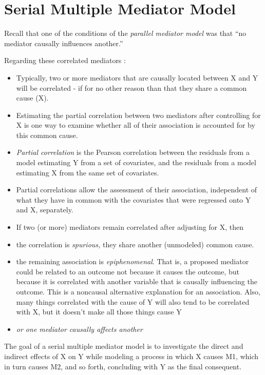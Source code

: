 \documentclass[
  11pt,
]{book}
\providecommand{\tightlist}{%
  \setlength{\itemsep}{0pt}\setlength{\parskip}{0pt}}
\begin{document}
\hypertarget{serial-multiple-mediator-model}{%
\section{Serial Multiple Mediator Model}\label{serial-multiple-mediator-model}}

Recall that one of the conditions of the \emph{parallel mediator model} was that ``no mediator causally influences another.''

Regarding these correlated mediators \citep{hayes_more_2022}:

\begin{itemize}
\tightlist
\item
  Typically, two or more mediators that are causally located between X and Y will be correlated - if for no other reason than that they share a common cause (X).
\item
  Estimating the partial correlation between two mediators after controlling for X is one way to examine whether all of their association is accounted for by this common cause.
\item
  \emph{Partial correlation} is the Pearson correlation between the residuals from a model estimating Y from a set of covariates, and the residuals from a model estimating X from the same set of covariates.
\item
  Partial correlations allow the assessment of their association, independent of what they have in common with the covariates that were regressed onto Y and X, separately.
\item
  If two (or more) mediators remain correlated after adjusting for X, then
\item
  the correlation is \emph{spurious,} they share another (unmodeled) common cause.
\item
  the remaining association is \emph{epiphenomenal}. That is, a proposed mediator could be related to an outcome not because it causes the outcome, but because it is correlated with another variable that is causally influencing the outcome. This is a noncausal alternative explanation for an association. Also, many things correlated with the cause of Y will also tend to be correlated with X, but it doesn't make all those things cause Y
\item
  \emph{or one mediator causally affects another}
\end{itemize}

The goal of a serial multiple mediator model is to investigate the direct and indirect effects of X on Y while modeling a process in which X causes M1, which in turn causes M2, and so forth, concluding with Y as the final consequent.
\end{document}
